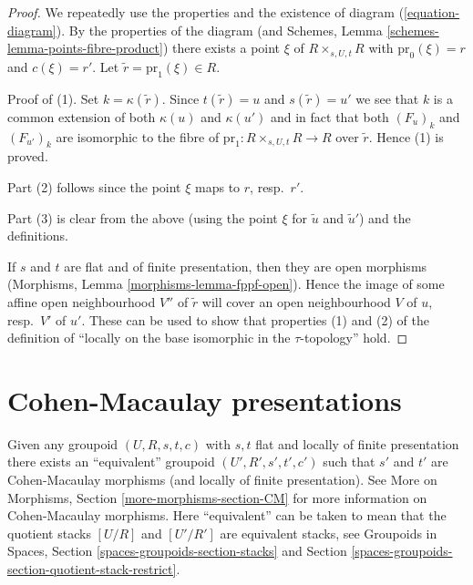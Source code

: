 \begin{proof}
We repeatedly use the properties and the existence of
diagram (\ref{equation-diagram}).
By the properties of the diagram (and
Schemes, Lemma \ref{schemes-lemma-points-fibre-product})
there exists a point $\xi$ of $R \times_{s, U, t} R$
with $\text{pr}_0(\xi) = r$ and $c(\xi) = r'$.
Let $\tilde r = \text{pr}_1(\xi) \in R$.

\medskip\noindent
Proof of (1). Set $k = \kappa(\tilde r)$. Since $t(\tilde r) = u$
and $s(\tilde r) = u'$ we see that $k$ is a common extension
of both $\kappa(u)$ and $\kappa(u')$ and in fact that
both $(F_u)_k$ and $(F_{u'})_k$ are isomorphic to the fibre of
$\text{pr}_1 : R \times_{s, U, t} R \to R$ over $\tilde r$.
Hence (1) is proved.

\medskip\noindent
Part (2) follows since the point $\xi$ maps to $r$, resp.\ $r'$.

\medskip\noindent
Part (3) is clear from the above (using the point $\xi$ for
$\tilde u$ and $\tilde u'$) and the definitions.

\medskip\noindent
If $s$ and $t$ are flat and of finite presentation, then
they are open morphisms (Morphisms, Lemma \ref{morphisms-lemma-fppf-open}).
Hence the image of some affine open neighbourhood $V''$ of $\tilde r$ will
cover an open neighbourhood $V$ of $u$, resp.\ $V'$ of $u'$.
These can be used to show that properties (1) and (2) of the
definition of ``locally on the base isomorphic in the
$\tau$-topology'' hold.
\end{proof}







\section{Cohen-Macaulay presentations}
\label{section-CM}

\noindent
Given any groupoid $(U, R, s, t, c)$ with $s, t$ flat and
locally of finite presentation there exists an ``equivalent''
groupoid $(U', R', s', t', c')$ such that $s'$ and $t'$ are
Cohen-Macaulay morphisms (and locally of finite presentation). See
More on Morphisms, Section \ref{more-morphisms-section-CM}
for more information on Cohen-Macaulay morphisms.
Here ``equivalent'' can be taken to mean that the quotient stacks
$[U/R]$ and $[U'/R']$ are equivalent stacks, see
Groupoids in Spaces, Section \ref{spaces-groupoids-section-stacks}
and Section \ref{spaces-groupoids-section-quotient-stack-restrict}.

